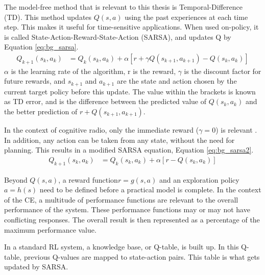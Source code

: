 \documentclass[11pt]{report}
\begin{document}
	\par The model-free method that is relevant to this thesis is Temporal-Difference (TD). This method updates $Q(s,a)$ using the past experiences at each time step. This makes it useful for time-sensitive applications. When used on-policy, it is called State-Action-Reward-State-Action (SARSA), and updates Q by Equation \ref{eq:bg_sarsa}.
	\begin{align}
		Q_{k+1}(s_k,a_k) &= Q_k(s_k,a_k) + \alpha[r + \gamma Q(s_{k+1},a_{k+1})- Q(s_k,a_k)] \label{eq:bg_sarsa}
	\end{align}
	$\alpha$ is the learning rate of the algorithm, r is the reward, $\gamma$ is the discount factor for future rewards, and $s_{k+1}$ and $a_{k+1}$ are the state and action chosen by the current target policy before this update. The value within the brackets is known as TD error, and is the difference between the predicted value of $Q(s_k,a_k)$ and the better prediction of $r + Q(s_{k+1},a_{k+1})$. 
	\par In the context of cognitive radio, only the immediate reward ($\gamma = 0$) is relevant \cite{AIAA_Paper}. In addition, any action can be taken from any state, without the need for planning. This results in a modified SARSA equation, Equation \ref{eq:bg_sarsa2}.
	\begin{align}
		Q_{k+1}(s_k,a_k) &= Q_k(s_k,a_k) + \alpha[r - Q(s_k,a_k)] \label{eq:bg_sarsa2}
	\end{align}
	\par Beyond $Q(s,a)$, a reward function$r = g(s,a)$ and an exploration policy $a = h(s)$ need to be defined before a practical model is complete. In the context of the CE, a multitude of performance functions are relevant to the overall performance of the system. These performance functions may or may not have conflicting responses. The overall result is then represented as a percentage of the maximum performance value. 
	\par In a standard RL system, a knowledge base, or Q-table, is built up. In this Q-table, previous Q-values are mapped to state-action pairs. This table is what gets updated by SARSA.
	
\end{document}
